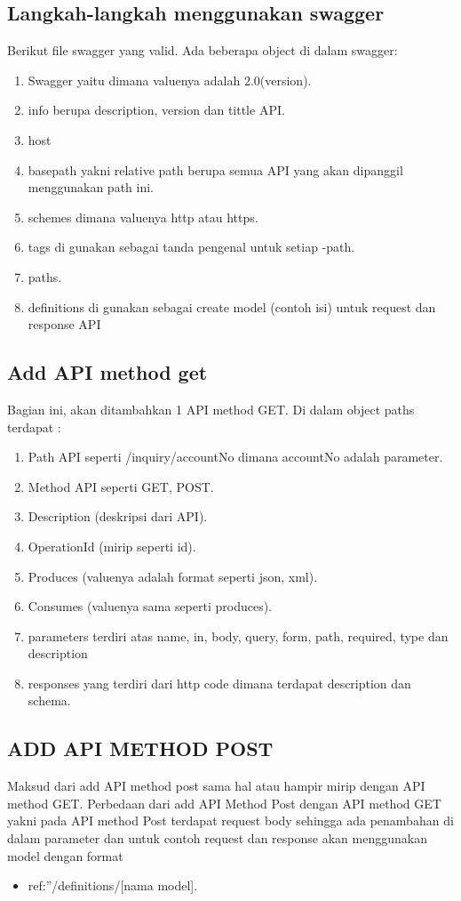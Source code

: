 \subsection{Langkah-langkah menggunakan swagger } 
Berikut file swagger yang valid. Ada beberapa object di dalam swagger:
\begin{enumerate}
\item Swagger yaitu dimana valuenya adalah 2.0(version).
\item info berupa description, version dan tittle API.
\item host
\item basepath yakni relative path berupa semua API yang akan dipanggil menggunakan path ini.
\item schemes dimana valuenya http atau https.
\item tags di gunakan sebagai tanda pengenal untuk setiap -path.
\item paths.
\item definitions di gunakan sebagai create model (contoh isi) untuk request dan response API
\end{enumerate}

\subsection{Add API method get}
Bagian ini, akan ditambahkan 1 API method GET. Di dalam object paths terdapat :
\begin{enumerate}
\item Path API seperti /inquiry/{accountNo} dimana accountNo adalah parameter.
\item Method API seperti GET, POST.
\item Description (deskripsi dari API).
\item OperationId (mirip seperti id).
\item Produces (valuenya adalah format seperti json, xml).
\item Consumes (valuenya sama seperti produces).
\item parameters terdiri atas name, in, body, query, form, path, required, type dan description
\item responses yang terdiri dari http code dimana terdapat description dan schema.
\end{enumerate}
\subsection{ADD API METHOD POST}
Maksud dari add API method post sama hal atau hampir mirip dengan  API method GET. Perbedaan dari add API Method Post dengan API method GET yakni pada API method Post terdapat request body sehingga ada penambahan di dalam parameter dan untuk contoh request dan response akan menggunakan model dengan format 
\begin{itemize}
\item ref:”/definitions/[nama model].
\end{itemize}

